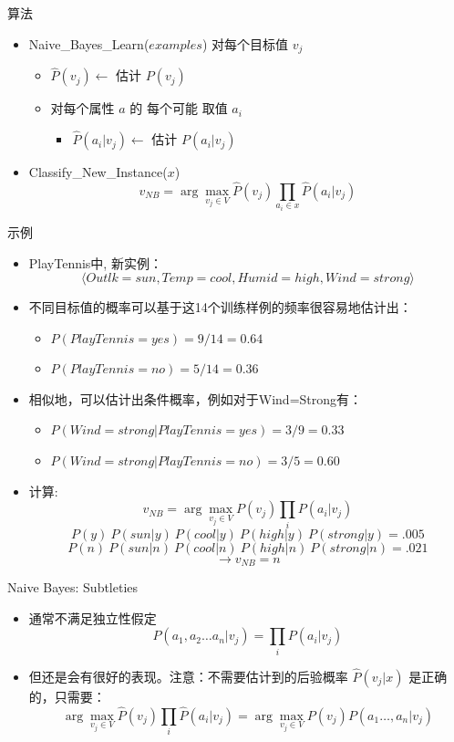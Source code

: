 \documentclass[presentation]{beamer}
\begin{document}
\begin{frame}[label={sec:org01cff4b}]{算法}
\begin{itemize}
\item Naive\_Bayes\_Learn(\(examples\))
对每个目标值 \(v_j\)
\begin{itemize}
\item \(\hat{P}(v_j) \leftarrow\) 估计 \(P(v_j)\)
\item 对每个属性 \(a\) 的 每个可能 取值 \(a_i\) 
\begin{itemize}
\item \(\hat{P}(a_i|v_j) \leftarrow\) 估计 \(P(a_i|v_j)\)
\end{itemize}
\end{itemize}
\item Classify\_New\_Instance(\(x\))
$$v_{NB} = \arg \max_{v_{j} \in V} \hat{P}(v_{j}) \prod_{a_i \in x} \hat{P}(a_{i} | v_{j})$$
\end{itemize}
\end{frame}

\begin{frame}[label={sec:org91b8380}]{示例}
\begin{itemize}
\item PlayTennis中, 新实例： 
$$\langle Outlk=sun, Temp=cool, Humid=high, Wind=strong \rangle$$
\item 不同目标值的概率可以基于这14个训练样例的频率很容易地估计出：
\begin{itemize}
\item \(P(PlayTennis=yes)=9/14=0.64\)
\item \(P(PlayTennis=no)=5/14=0.36\)
\end{itemize}
\item 相似地，可以估计出条件概率，例如对于Wind=Strong有：
\begin{itemize}
\item \(P(Wind=strong|PlayTennis=yes)=3/9=0.33\)
\item \(P(Wind=strong|PlayTennis=no)=3/5=0.60\)
\end{itemize}
\item 计算:
$$v_{NB} = \arg \max_{v_{j} \in V} P(v_{j}) \prod_{i} P(a_{i} | v_{j})$$
\[P(y)\ P(sun|y)\ P(cool|y)\ P(high|y)\ P(strong|y) = .005 \]
\[P(n)\ P(sun|n)\ P(cool|n)\ P(high|n)\ P(strong|n) = .021 \]
\[ \rightarrow v_{NB} = n \]
\end{itemize}
\end{frame}

\begin{frame}[label={sec:orgfd10573}]{Naive Bayes: Subtleties}
\begin{itemize}
\item 通常不满足独立性假定
$$P(a_{1}, a_{2} \ldots a_{n}|v_{j}) = \prod_{i} P(a_{i} | v_{j})$$
\item 但还是会有很好的表现。注意：不需要估计到的后验概率 \(\hat{P}(v_j|x)\) 是正确的，只需要：
$$\arg\max_{v_{j}\in V}\hat{P}(v_{j})\prod_{i}\hat{P}(a_{i}|v_{j})=\arg\max_{v_{j} \in V}  P(v_{j}) P(a_{1} \ldots, a_n | v_{j})$$
\end{itemize}
\end{frame}
\end{document}
